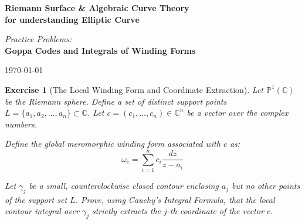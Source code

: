 \documentclass[11pt]{article}
\newtheorem{problem}{Exercise}
\begin{document}
	
	\begin{titlepage}
		\centering
		\vspace*{4cm}
		
		{\Huge \textbf{Riemann Surface \& Algebraic Curve Theory}} \\
		\vspace{0.5cm}
		{\Large \textbf{for understanding Elliptic Curve}} \\
		
		\vspace{2cm}
		
		{\Large \textit{Practice Problems:}} \\
		\vspace{0.2cm}
		{\huge \textbf{Goppa Codes and Integrals of Winding Forms}}
		
		\vfill
		
		{\large \today}
	\end{titlepage}
	
	\newpage
	\thispagestyle{plain}
	
	\begin{problem}[The Local Winding Form and Coordinate Extraction]
		Let $\mathbb{P}^1(\mathbb{C})$ be the Riemann sphere. Define a set of distinct support points $L = \{a_1, a_2, \dots, a_n\} \subset \mathbb{C}$. Let $c = (c_1, \dots, c_n) \in \mathbb{C}^n$ be a vector over the complex numbers. 
		
		Define the global meromorphic winding form associated with $c$ as:
		$$ \omega_c = \sum_{i=1}^n c_i \frac{dz}{z - a_i} $$
		
		Let $\gamma_j$ be a small, counterclockwise closed contour enclosing $a_j$ but no other points of the support set $L$. Prove, using Cauchy's Integral Formula, that the local contour integral over $\gamma_j$ strictly extracts the $j$-th coordinate of the vector $c$.
	\end{problem}
	
	\vspace{0.5cm}
	
\end{document}
